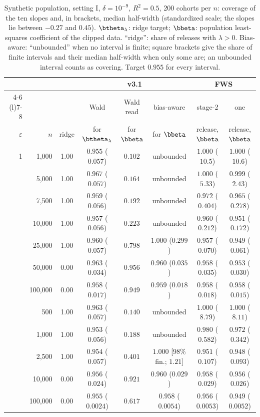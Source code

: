 \begin{table}[t]
  \centering
  \small
  \caption{Synthetic population, setting I, $\delta = 10^{-9}$, $R^2 = 0.5$, 200 cohorts per $n$: coverage of the ten slopes and, in brackets, median half-width (standardized scale; the slopes lie between $-0.27$ and $0.45$). $\btheta_\lambda$: ridge target; $\bbeta$: population least-squares coefficient of the clipped data. ``ridge'': share of releases with $\lambda > 0$. Bias-aware: ``unbounded'' when no interval is finite; square brackets give the share of finite intervals and their median half-width when only some are; an unbounded interval counts as covering. Target $0.955$ for every interval.}
  \label{tab:fws_cov}
  \footnotesize
  \setlength{\tabcolsep}{3pt}
  \begin{tabular}{@{}rrcccccc@{}}
    \toprule
    & & & \multicolumn{3}{c}{v3.1} & \multicolumn{2}{c}{FWS} \\
    \cmidrule(lr){4-6} \cmidrule(l){7-8}
    & & & Wald & Wald read & bias-aware & stage-2 & one \\
    $\varepsilon$ & $n$ & ridge & for $\btheta_\lambda$ & for $\bbeta$ & for $\bbeta$ & release, $\bbeta$ & release, $\bbeta$ \\
    \midrule
    1 & 1{,}000 & 1.00 & $0.955$ ($0.057$) & $0.102$ & unbounded & $1.000$ ($10.5$) & $1.000$ ($10.6$) \\
     & 5{,}000 & 1.00 & $0.967$ ($0.057$) & $0.164$ & unbounded & $1.000$ ($5.33$) & $0.999$ ($2.43$) \\
     & 7{,}500 & 1.00 & $0.959$ ($0.056$) & $0.192$ & unbounded & $0.972$ ($0.404$) & $0.965$ ($0.278$) \\
     & 10{,}000 & 1.00 & $0.957$ ($0.056$) & $0.223$ & unbounded & $0.960$ ($0.212$) & $0.951$ ($0.172$) \\
     & 25{,}000 & 1.00 & $0.960$ ($0.057$) & $0.798$ & $1.000$ ($0.299$) & $0.957$ ($0.070$) & $0.949$ ($0.061$) \\
     & 50{,}000 & 0.00 & $0.963$ ($0.034$) & $0.956$ & $0.960$ ($0.035$) & $0.958$ ($0.035$) & $0.953$ ($0.030$) \\
     & 100{,}000 & 0.00 & $0.958$ ($0.017$) & $0.949$ & $0.959$ ($0.018$) & $0.958$ ($0.018$) & $0.958$ ($0.015$) \\
    \addlinespace
    8 & 500 & 1.00 & $0.963$ ($0.057$) & $0.140$ & unbounded & $1.000$ ($8.79$) & $1.000$ ($8.11$) \\
     & 1{,}000 & 1.00 & $0.953$ ($0.056$) & $0.188$ & unbounded & $0.980$ ($0.582$) & $0.972$ ($0.342$) \\
     & 2{,}500 & 1.00 & $0.954$ ($0.057$) & $0.401$ & $1.000$ [98\% fin.; $1.21$] & $0.951$ ($0.107$) & $0.948$ ($0.093$) \\
     & 10{,}000 & 0.00 & $0.956$ ($0.024$) & $0.921$ & $0.960$ ($0.029$) & $0.958$ ($0.029$) & $0.956$ ($0.026$) \\
     & 100{,}000 & 0.00 & $0.955$ ($0.0024$) & $0.617$ & $0.958$ ($0.0054$) & $0.956$ ($0.0053$) & $0.949$ ($0.0052$) \\
    \bottomrule
  \end{tabular}
\end{table}

